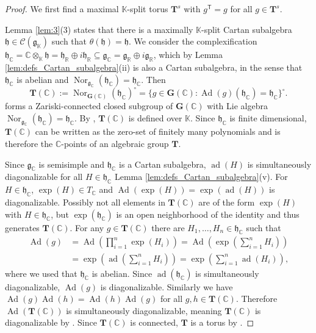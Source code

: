 \documentclass[12pt]{amsart}
\newcommand{\R}{\mathbb{R} }
\newcommand{\C}{\mathbb{C} }
\newcommand{\K}{\mathbb{K}}
\newcommand{\frakg}{\mathfrak{g}}
\newcommand{\frakh}{\mathfrak{h}}
\newcommand{\bG}{\mathbf{G}}
\newcommand{\bT}{\mathbf{T}}
\newcommand{\tran}{{^{\mathsf{T}}\!}}
\numberwithin{equation}{section}
\theoremstyle{remark} %
\begin{document}
\begin{proof}  We first find a maximal $\K$-split torus $\bT^s$ with $g\tran=g$ for all $g \in \bT^s$.
	
    Lemma \ref{lem:3}(3) states that there is a maximally $\K$-split Cartan subalgebra $\frakh \in \mathcal{C}(\frakg_\K)$ such that $\theta(\frakh) = \frakh$. We consider the complexification $\frakh_{\C} = \C \otimes_{\K} \frakh = \frakh_\R \oplus i \frakh_\R  \subseteq \frakg_{\C} = \frakg_\R \oplus i \frakg_\R$, which by Lemma \ref{lem:defs_Cartan_subalgebra}(ii) is also a Cartan subalgebra, in the sense that $\frakh_\C$ is abelian and $\operatorname{Nor}_{\frakg_\C}(\frakh_\C) = \frakh_\C$.
    Then
    $$
    \bT(\C) := \operatorname{Nor}_{\bG(\C)}(\frakh_\C)^{\circ} = \{ g \in \bG(\C) \colon \operatorname{Ad}(g)(\frakh_\C) = \frakh_\C \}^{\circ}.
    $$
    forms a Zariski-connected closed subgroup of $\bG(\C)$ with Lie algebra $\operatorname{Nor}_{\frakg_\C}(\frakh_\C) = \frakh_\C$. By \cite[Lemma 18.5]{Bor}, $\bT(\C)$ is defined over $\K$. Since $\frakh_\C$ is finite dimensional, $\bT(\C)$ can be written as the zero-set of finitely many polynomials and is therefore the $\C$-points of an algebraic group $\bT$.
    
	
	Since $\frakg_\C$ is semisimple and $\frakh_\C$ is a Cartan subalgebra, $\operatorname{ad}(H)$ is simultaneously diagonalizable for all $H \in \frakh_\C$ Lemma \ref{lem:defs_Cartan_subalgebra}(v). For $H \in \frakh_\C$, $\exp(H) \in T_\C$ and $\operatorname{Ad}(\exp(H)) = \exp(\operatorname{ad}(H))$ is diagonalizable. Possibly not all elements in $\bT(\C)$ are of the form $\exp(H)$ with $H \in \frakh_\C$, but $\exp(\frakh_\C)$ is an open neighborhood of the identity and thus generates $\bT(\C)$. For any $g\in \bT(\C)$ there are $H_1, \ldots , H_n \in \frakh_\C$ such that
	\begin{align*}
		\operatorname{Ad}(g) &= \operatorname{Ad}\left(\prod_{i=1}^n \exp(H_i) \right)= \operatorname{Ad}\left(\exp \left(\sum_{i=1}^n H_i\right)\right) \\
		&= \exp\left( \operatorname{ad}\left( \sum_{i=1}^n H_i  \right) \right)
		=\exp\left( \sum_{i=1}^n \operatorname{ad}\left(  H_i  \right) \right),
	\end{align*}
	where we used that $\frakh_\C$ is abelian. Since $\operatorname{ad}(\frakh_\C)$ is simultaneously diagonalizable, $\operatorname{Ad}(g)$ is diagonalizable. Similarly we have $\operatorname{Ad}(g)\operatorname{Ad}(h) = \operatorname{Ad}(h) \operatorname{Ad}(g)$ for all $g , h\in \bT(\C)$. Therefore $\operatorname{Ad}(\bT(\C))$ is simultaneously diagonalizable, meaning $\bT(\C)$ is diagonalizable by \cite[Proposition 8.4]{Bor}. Since $\bT(\C)$ is connected, $\bT$ is a torus by \cite[Proposition 8.5]{Bor}.
	

\end{proof}
\end{document}
